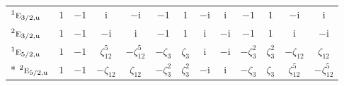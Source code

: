 \documentclass[10pt,a4paper]{article}
\numberwithin{equation}{section}
\newcommand{\irr}[1]{\text{\normalfont\scshape #1}}
\newcommand{\conjpair}[1]{{}^{#1}}
\newcommand{\ptag}[1]{\mathrm{#1}}
\newcommand{\iunit}{\mathrm{i}}
\newcommand{\rootunity}[1]{\zeta_{#1}}
\begin{document}
{\begin{longtable}{@{}lcccccccccccc@{}}
$\conjpair{1}\irr{e}_{3/2,\ptag{u}}$ & $1$ & $-1$ & $\iunit{}$ & $-\iunit{}$ & $-1$ & $1$ & $-\iunit{}$ & $\iunit{}$ & $-1$ & $1$ & $-\iunit{}$ & $\iunit{}$\\
$\conjpair{2}\irr{e}_{3/2,\ptag{u}}$ & $1$ & $-1$ & $-\iunit{}$ & $\iunit{}$ & $-1$ & $1$ & $\iunit{}$ & $-\iunit{}$ & $-1$ & $1$ & $\iunit{}$ & $-\iunit{}$\\
$\conjpair{1}\irr{e}_{5/2,\ptag{u}}$ & $1$ & $-1$ & $\rootunity{12}^{5}$ & $-\rootunity{12}^{5}$ & $-\rootunity{3}$ & $\rootunity{3}$ & $\iunit{}$ & $-\iunit{}$ & $-\rootunity{3}^{2}$ & $\rootunity{3}^{2}$ & $-\rootunity{12}$ & $\rootunity{12}$\\*
$\conjpair{2}\irr{e}_{5/2,\ptag{u}}$ & $1$ & $-1$ & $-\rootunity{12}$ & $\rootunity{12}$ & $-\rootunity{3}^{2}$ & $\rootunity{3}^{2}$ & $-\iunit{}$ & $\iunit{}$ & $-\rootunity{3}$ & $\rootunity{3}$ & $\rootunity{12}^{5}$ & $-\rootunity{12}^{5}$\\
\bottomrule\end{longtable}}
\end{document}
